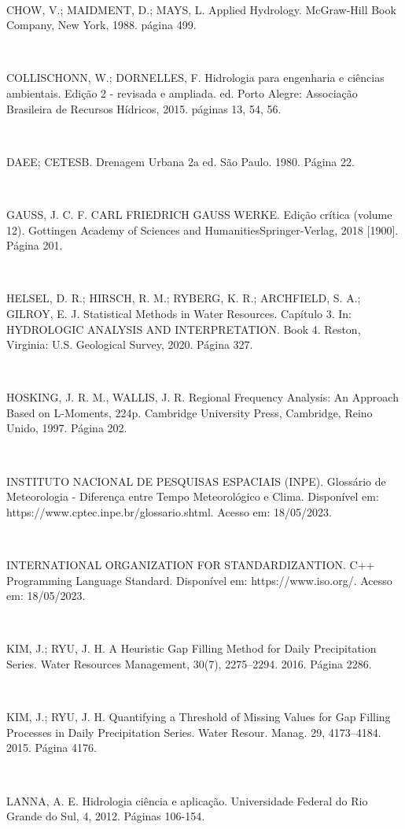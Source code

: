 \begin{flushleft}
\

CHOW, V.; MAIDMENT, D.; MAYS, L. Applied Hydrology. McGraw-Hill Book Company, New York, 1988. página 499.

\

COLLISCHONN, W.; DORNELLES, F. Hidrologia para engenharia e ciências ambientais. Edição 2 - revisada e ampliada. ed. Porto Alegre: Associação Brasileira de Recursos Hídricos, 2015. páginas 13, 54, 56.

\

DAEE; CETESB. Drenagem Urbana 2a ed. São Paulo. 1980. Página 22.

\

GAUSS, J. C. F. CARL FRIEDRICH GAUSS WERKE. Edição crítica (volume 12). Gottingen Academy of Sciences and HumanitiesSpringer-Verlag, 2018 [1900]. Página 201.

\

HELSEL, D. R.; HIRSCH, R. M.; RYBERG, K. R.; ARCHFIELD, S. A.; GILROY, E. J. Statistical Methods in Water Resources. Capítulo 3. In: HYDROLOGIC ANALYSIS AND INTERPRETATION. Book 4. Reston, Virginia: U.S. Geological Survey, 2020. Página 327.

\

HOSKING, J. R. M., WALLIS, J. R. Regional Frequency Analysis: An Approach Based on L-Moments, 224p. Cambridge University Press, Cambridge, Reino Unido, 1997. Página 202.

\

INSTITUTO NACIONAL DE PESQUISAS ESPACIAIS (INPE). Glossário de Meteorologia - Diferença entre Tempo Meteorológico e Clima. Disponível em: https://www.cptec.inpe.br/glossario.shtml. Acesso em: 18/05/2023.

\

INTERNATIONAL ORGANIZATION FOR STANDARDIZANTION. C++ Programming Language Standard. Disponível em: https://www.iso.org/. Acesso em: 18/05/2023.

\

KIM, J.; RYU, J. H. A Heuristic Gap Filling Method for Daily Precipitation Series. Water Resources Management, 30(7), 2275–2294. 2016. Página 2286.

\

KIM, J.; RYU, J. H. Quantifying a Threshold of Missing Values for Gap Filling Processes in Daily Precipitation Series. Water Resour. Manag. 29, 4173–4184. 2015. Página 4176.

\

LANNA, A. E. Hidrologia ciência e aplicação. Universidade Federal do Rio Grande do Sul, 4, 2012. Páginas 106-154.


\end{flushleft}
